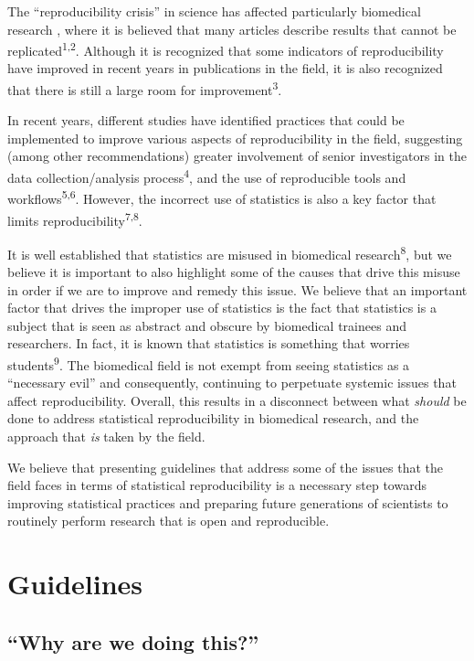 \documentclass[smallextended]{svjour3}       %
\begin{document}
The ``reproducibility crisis'' in science has affected particularly
biomedical research , where it is believed that many articles describe
results that cannot be replicated\textsuperscript{1,2}. Although it is
recognized that some indicators of reproducibility have improved in
recent years in publications in the field, it is also recognized that
there is still a large room for improvement\textsuperscript{3}.

In recent years, different studies have identified practices that could
be implemented to improve various aspects of reproducibility in the
field, suggesting (among other recommendations) greater involvement of
senior investigators in the data collection/analysis
process\textsuperscript{4}, and the use of reproducible tools and
workflows\textsuperscript{5,6}. However, the incorrect use of statistics
is also a key factor that limits reproducibility\textsuperscript{7,8}.

It is well established that statistics are misused in biomedical
research\textsuperscript{8}, but we believe it is important to also
highlight some of the causes that drive this misuse in order if we are
to improve and remedy this issue. We believe that an important factor
that drives the improper use of statistics is the fact that statistics
is a subject that is seen as abstract and obscure by biomedical trainees
and researchers. In fact, it is known that statistics is something that
worries students\textsuperscript{9}. The biomedical field is not exempt
from seeing statistics as a ``necessary evil'' and consequently,
continuing to perpetuate systemic issues that affect reproducibility.
Overall, this results in a disconnect between what \emph{should} be done
to address statistical reproducibility in biomedical research, and the
approach that \emph{is} taken by the field.

We believe that presenting guidelines that address some of the issues
that the field faces in terms of statistical reproducibility is a
necessary step towards improving statistical practices and preparing
future generations of scientists to routinely perform research that is
open and reproducible.

\hypertarget{guidelines}{%
\section{Guidelines}\label{guidelines}}

\hypertarget{why-are-we-doing-this}{%
\subsection{``Why are we doing this?''}\label{why-are-we-doing-this}}
\end{document}
